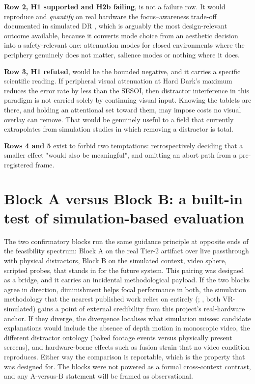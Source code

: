 \textbf{Row 2, H1 supported and H2b failing}, is not a failure row. It would reproduce and
\textit{quantify} on real hardware the focus--awareness trade-off documented in simulated DR
\citep{mclaughlin2025,murph2021}, which is arguably the most design-relevant outcome
available, because it converts mode choice from an aesthetic decision into a safety-relevant one:
attenuation modes for closed environments where the periphery genuinely does not matter, salience
modes or nothing where it does.

\textbf{Row 3, H1 refuted}, would be the bounded negative, and it carries a specific scientific
reading. If peripheral visual attenuation at Hard Dark's maximum reduces the error rate by less than
the SESOI, then distractor interference in this paradigm is not carried solely by continuing visual
input. Knowing the tablets are there, and holding an attentional set toward them, may impose costs no
visual overlay can remove. That would be genuinely useful to a field that currently extrapolates from
simulation studies in which removing a distractor is total.

\textbf{Rows 4 and 5} exist to forbid two temptations: retrospectively deciding that a smaller effect
"would also be meaningful", and omitting an abort path from a pre-registered frame.

\section{Block A versus Block B: a built-in test of simulation-based evaluation}

The two confirmatory blocks run the same guidance principle at opposite ends of the feasibility
spectrum: Block A on the real Tier-2 artifact over live passthrough with physical distractors,
Block B on the simulated context, video sphere, scripted probes, that stands in for the
future system. This pairing was designed as a bridge, and it carries an incidental methodological
payload. If the two blocks agree in direction, diminishment helps
focal performance in both, the simulation methodology that the nearest published work relies on
entirely (\citealp{cheng2022}; \citealp{mclaughlin2025}, both VR-simulated) gains a point of external
credibility from this project's real-hardware anchor. If they diverge, the divergence localises
what simulation misses: candidate explanations would include the absence of depth motion in
monoscopic video, the different distractor ontology (baked footage events versus physically present
screens), and hardware-borne effects such as fusion strain that no video condition reproduces.
Either way the comparison is reportable, which is the property that was designed for. The blocks
were not powered as a formal cross-context contrast, and any A-versus-B statement will be framed as
observational.

